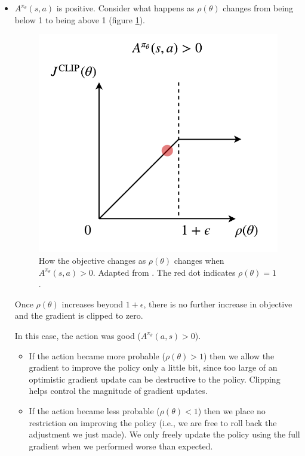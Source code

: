 \documentclass[journal, onecolumn, 12pt, draftclsnofoot]{IEEEtran}
\begin{document}
		\begin{itemize}
			\item $A^{\pi_\theta}(s,a)$ is positive. Consider what happens as $\rho(\theta)$ changes from being below 1 to being above 1 (figure \ref{fig:clipped-objective-a-gtz}).
			\begin{figure}[ht]
				\begin{center}
				\includegraphics[scale=0.75]{fig/clipped-objective-a-gtz.pdf}
			\end{center}
				\caption{How the objective changes as $\rho(\theta)$ changes when $A^{\pi_\theta}(s,a) > 0$. Adapted from \cite{ppo}. The red dot indicates $\rho(\theta) = 1$.}
				\label{fig:clipped-objective-a-gtz}
			\end{figure}
			Once $\rho(\theta)$ increases beyond $1 + \epsilon$, there is no further increase in objective and the gradient is clipped to zero.
			\par In this case, the action was good ($A^{\pi_\theta}(a,s) > 0$).
			\begin{itemize}
				\item If the action became more probable ($\rho(\theta) > 1$) then we allow the gradient to improve the policy only a little bit, since too large of an optimistic gradient update can be destructive to the policy. Clipping helps control the magnitude of gradient updates.
				\item If the action became less probable ($\rho(\theta) < 1$) then we place no restriction on improving the policy (i.e., we are free to roll back the adjustment we just made). We only freely update the policy using the full gradient when we performed worse than expected.

\end{itemize}
\end{itemize}
\end{document}
